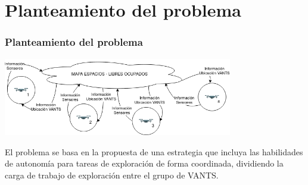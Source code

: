 \documentclass[
  24pt, %
  aspectratio=169, %
]{beamer}
\begin{document}
\section{Planteamiento del problema}
\begin{frame}
  \frametitle{Planteamiento del problema}
  \centering
  \includegraphics[width=10cm]{problema}


  
  
  \bigskip %
  El problema se basa en la propuesta de una estrategia que incluya las habilidades de autonomía para tareas de exploración de forma coordinada, dividiendo la carga de trabajo de exploración entre el grupo de VANTS.\\
  
    

\end{frame}
\end{document}
